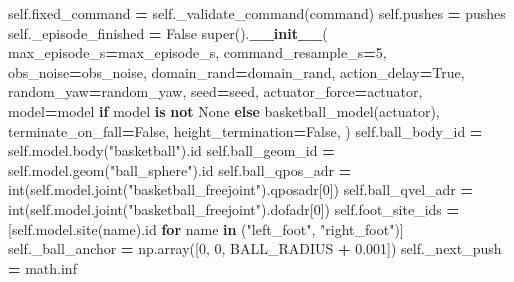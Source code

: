 \documentclass[
  chinese,
  11pt,
  letterpaper,
]{article}
\newenvironment{Shaded}{\begin{snugshade}}{\end{snugshade}}
\newcommand{\BuiltInTok}[1]{#1}
\newcommand{\ControlFlowTok}[1]{\textcolor[rgb]{0.13,0.29,0.53}{\textbf{#1}}}
\newcommand{\DecValTok}[1]{\textcolor[rgb]{0.00,0.00,0.81}{#1}}
\newcommand{\FloatTok}[1]{\textcolor[rgb]{0.00,0.00,0.81}{#1}}
\newcommand{\FunctionTok}[1]{\textcolor[rgb]{0.13,0.29,0.53}{\textbf{#1}}}
\newcommand{\KeywordTok}[1]{\textcolor[rgb]{0.13,0.29,0.53}{\textbf{#1}}}
\newcommand{\NormalTok}[1]{#1}
\newcommand{\OperatorTok}[1]{\textcolor[rgb]{0.81,0.36,0.00}{\textbf{#1}}}
\newcommand{\StringTok}[1]{\textcolor[rgb]{0.31,0.60,0.02}{#1}}
\newcommand{\VariableTok}[1]{\textcolor[rgb]{0.00,0.00,0.00}{#1}}
\renewenvironment{Shaded}{\par\smallskip}{\par\smallskip}
\begin{document}
\begin{Shaded}
\begin{Highlighting}[]
        \VariableTok{self}\NormalTok{.fixed\_command }\OperatorTok{=} \VariableTok{self}\NormalTok{.\_validate\_command(command)}
        \VariableTok{self}\NormalTok{.pushes }\OperatorTok{=}\NormalTok{ pushes}
        \VariableTok{self}\NormalTok{.\_episode\_finished }\OperatorTok{=} \VariableTok{False}
        \BuiltInTok{super}\NormalTok{().}\FunctionTok{\_\_init\_\_}\NormalTok{(}
\NormalTok{            max\_episode\_s}\OperatorTok{=}\NormalTok{max\_episode\_s, command\_resample\_s}\OperatorTok{=}\DecValTok{5}\NormalTok{,}
\NormalTok{            obs\_noise}\OperatorTok{=}\NormalTok{obs\_noise, domain\_rand}\OperatorTok{=}\NormalTok{domain\_rand, action\_delay}\OperatorTok{=}\VariableTok{True}\NormalTok{,}
\NormalTok{            random\_yaw}\OperatorTok{=}\NormalTok{random\_yaw, seed}\OperatorTok{=}\NormalTok{seed, actuator\_force}\OperatorTok{=}\NormalTok{actuator,}
\NormalTok{            model}\OperatorTok{=}\NormalTok{model }\ControlFlowTok{if}\NormalTok{ model }\KeywordTok{is} \KeywordTok{not} \VariableTok{None} \ControlFlowTok{else}\NormalTok{ basketball\_model(actuator),}
\NormalTok{            terminate\_on\_fall}\OperatorTok{=}\VariableTok{False}\NormalTok{, height\_termination}\OperatorTok{=}\VariableTok{False}\NormalTok{,}
\NormalTok{        )}
        \VariableTok{self}\NormalTok{.ball\_body\_id }\OperatorTok{=} \VariableTok{self}\NormalTok{.model.body(}\StringTok{"basketball"}\NormalTok{).}\BuiltInTok{id}
        \VariableTok{self}\NormalTok{.ball\_geom\_id }\OperatorTok{=} \VariableTok{self}\NormalTok{.model.geom(}\StringTok{"ball\_sphere"}\NormalTok{).}\BuiltInTok{id}
        \VariableTok{self}\NormalTok{.ball\_qpos\_adr }\OperatorTok{=} \BuiltInTok{int}\NormalTok{(}\VariableTok{self}\NormalTok{.model.joint(}\StringTok{"basketball\_freejoint"}\NormalTok{).qposadr[}\DecValTok{0}\NormalTok{])}
        \VariableTok{self}\NormalTok{.ball\_qvel\_adr }\OperatorTok{=} \BuiltInTok{int}\NormalTok{(}\VariableTok{self}\NormalTok{.model.joint(}\StringTok{"basketball\_freejoint"}\NormalTok{).dofadr[}\DecValTok{0}\NormalTok{])}
        \VariableTok{self}\NormalTok{.foot\_site\_ids }\OperatorTok{=}\NormalTok{ [}\VariableTok{self}\NormalTok{.model.site(name).}\BuiltInTok{id} \ControlFlowTok{for}\NormalTok{ name }\KeywordTok{in}\NormalTok{ (}\StringTok{"left\_foot"}\NormalTok{, }\StringTok{"right\_foot"}\NormalTok{)]}
        \VariableTok{self}\NormalTok{.\_ball\_anchor }\OperatorTok{=}\NormalTok{ np.array([}\DecValTok{0}\NormalTok{, }\DecValTok{0}\NormalTok{, BALL\_RADIUS }\OperatorTok{+} \FloatTok{0.001}\NormalTok{])}
        \VariableTok{self}\NormalTok{.\_next\_push }\OperatorTok{=}\NormalTok{ math.inf}


\end{Highlighting}
\end{Shaded}
\end{document}
